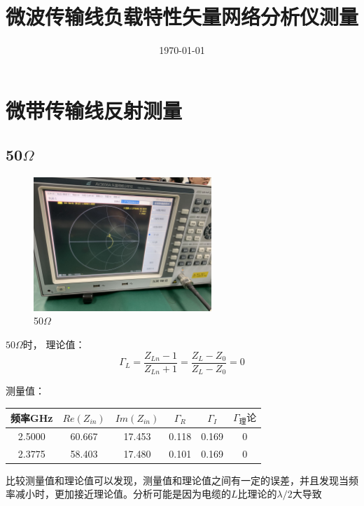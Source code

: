 \documentclass{../source/Experiment}
\title{微波传输线负载特性矢量网络分析仪测量}
\date{\today}
\begin{document}
    \makecover
    \makeheader

    \section{微带传输线反射测量}
        \subsection{50$\Omega$}
            \begin{figure}[H]
                \centering
                \includegraphics[width = 0.6\textwidth]{pic/49.92}
                \caption{50$\Omega$}
            \end{figure}
            $50\Omega$时，
            理论值：$$\Gamma _L = \frac{Z_{Ln}-1}{Z_{Ln}+1} = \frac{Z_L - Z_0}{Z_L - Z_0} = 0$$
            
            测量值：
            \begin{table}[H]
                \centering
                \begin{tabular}{|c|c|c|c|c|c|}
                \hline
                频率GHz  & $Re(Z_{in})$ & $Im(Z_{in})$ & $\Gamma _R$ & $\Gamma _I$ & $\Gamma _理论$ \\ \hline
                2.5000 & 60.667     & 17.453     & 0.118       & 0.169       & 0            \\ \hline
                2.3775 & 58.403     & 17.480     & 0.101       & 0.169       & 0            \\ \hline
                \end{tabular}
            \end{table}
        比较测量值和理论值可以发现，测量值和理论值之间有一定的误差，并且发现当频率减小时，更加接近理论值。分析可能是因为电缆的$L$比理论的$\lambda /2$大导致
\end{document}
